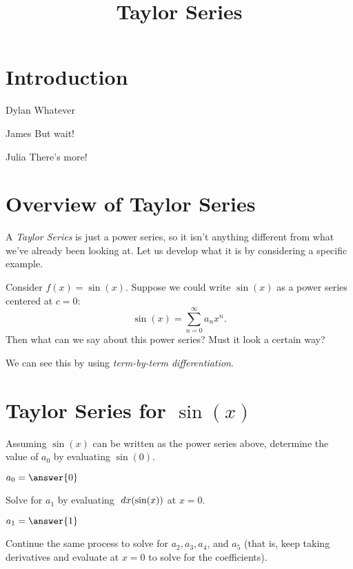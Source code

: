 \documentclass{ximera}
\title{Taylor Series}
\begin{document}
\maketitle

\section*{Introduction}

\begin{dialogue}
\item[Dylan] Whatever
\item[James] But wait!
\item[Julia] There's more!
\end{dialogue}


\section{Overview of Taylor Series}

A \emph{Taylor Series} is just a power series, so it isn't anything different from what we've already been looking at. Let us develop what it is by considering a specific example.

Consider $f(x) = \sin(x)$. Suppose we could write $\sin(x)$ as a power series centered at $c=0$:
\[
    \sin(x) = \sum_{n=0}^{\infty} a_n x^n.
\]
Then what can we say about this power series? Must it look a certain way? 
\begin{multipleChoice}
\begin{feedback}[correct]
We can see this by using \emph{term-by-term differentiation}.
\end{feedback}
\end{multipleChoice}

\section{Taylor Series for $\sin(x)$}

Assuming $\sin(x)$ can be written as the power series above, determine the value of $a_0$ by evaluating $\sin(0)$.

$a_0 = \answer{0}$

Solve for $a_1$ by evaluating $\; dx(\sin(x))$ at $x=0$.

$a_1 = \answer{1}$

Continue the same process to solve for $a_2, a_3, a_4$, and $a_5$ (that is, keep taking derivatives and evaluate at $x=0$ to solve for the coefficients).
\end{document}
